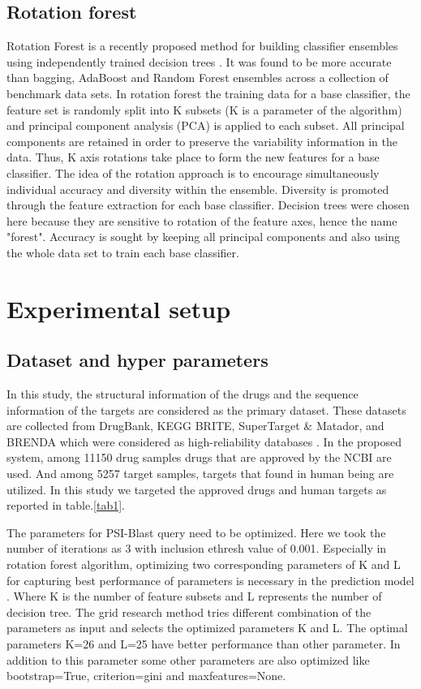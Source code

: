 \documentclass[conference]{IEEEtran}
\begin{document}
\subsection{Rotation forest }
Rotation Forest is a recently proposed method for building classifier ensembles using independently trained decision trees \cite{b4}. It was found to be more accurate than bagging, AdaBoost and Random Forest ensembles across a collection of benchmark data sets. In rotation forest the training data for a base classifier, the feature set is randomly split into K subsets (K is a parameter of the algorithm) and principal component analysis (PCA) is applied to each subset. All principal components are retained in order to preserve the variability information in the data. Thus, K axis rotations take place to form the new features for a base classifier. The idea of the rotation approach is to encourage simultaneously individual accuracy and diversity within the ensemble. Diversity is promoted through the feature extraction for each base classifier. Decision trees were chosen here because they are sensitive to rotation of the feature axes, hence the name "forest". Accuracy is sought by keeping all principal components and also using the whole data set to train each base classifier.


\section{Experimental setup}

\subsection{Dataset and hyper parameters}
In this study, the structural information of the drugs and the sequence information of the targets are considered as the primary dataset. These datasets are collected from DrugBank, KEGG BRITE, SuperTarget \& Matador, and BRENDA which were considered as high-reliability databases \cite{b15}. In the proposed system, among 11150 drug samples drugs that are approved by the NCBI are used. And among 5257 target samples, targets that found in human being are utilized. In this study we targeted the approved drugs and human targets as reported in table.\ref{tab1}.

The parameters for PSI-Blast query need to be optimized. Here we took the number of iterations as 3 with inclusion ethresh value of 0.001. Especially in rotation forest algorithm, optimizing two corresponding parameters of K and L for capturing best performance of parameters is necessary in the prediction model \cite{b20}. Where K is the number of feature subsets and L represents the number of decision tree. The grid research method tries different combination of the parameters as input and selects the optimized parameters K and L. The optimal parameters K=26 and L=25 have better performance than other parameter. In addition to this parameter some other parameters are also optimized like bootstrap=True, criterion=gini and maxfeatures=None. 
\end{document}
